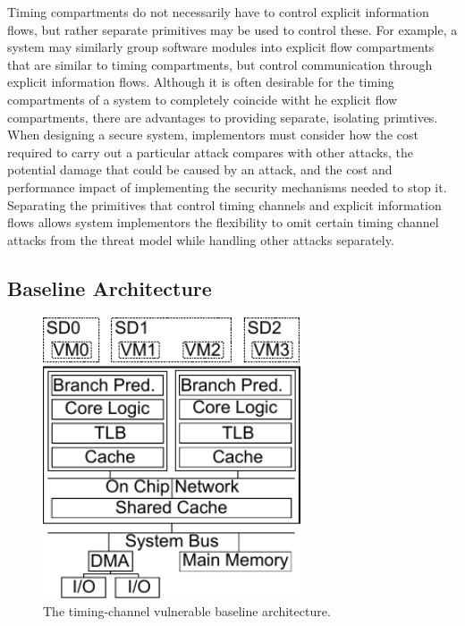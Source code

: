     Timing compartments do not necessarily have to control explicit information 
    flows, but rather separate primitives may be used to control these. For 
    example, a system may similarly group software modules into explicit flow 
    compartments that are similar to timing compartments, but control 
    communication through explicit information flows. Although it is often 
    desirable for the timing compartments of a system to completely coincide 
    witht he explicit flow compartments, there are advantages to providing 
    separate, isolating primtives. When designing a secure system, implementors 
    must consider how the cost required to carry out a particular attack 
    compares with other attacks, the potential damage that could be caused by 
    an attack, and the cost and performance impact of implementing the security 
    mechanisms needed to stop it. Separating the primitives that control timing 
    channels and explicit information flows allows system implementors the 
    flexibility to omit certain timing channel attacks from the threat model 
    while handling other attacks separately.

\subsection{Baseline Architecture}

    \begin{figure}
        \begin{center}
            \includegraphics[width=3in]{figs/baseline.pdf}
            \caption{The timing-channel vulnerable baseline architecture.}
            \label{fig:baseline}
        \end{center}
    \end{figure}

